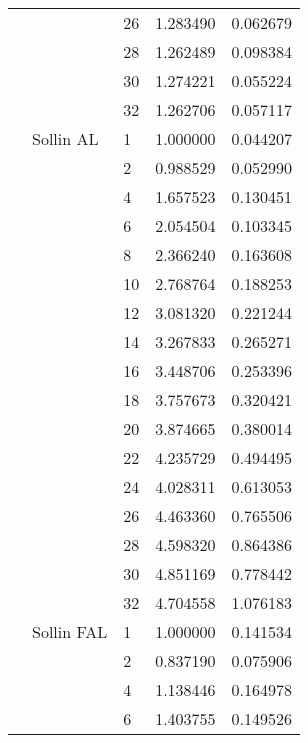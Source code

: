 \begin{tabular}{lllrr}
                      &            & 26 &  1.283490 &  0.062679 \\
                      &            & 28 &  1.262489 &  0.098384 \\
                      &            & 30 &  1.274221 &  0.055224 \\
                      &            & 32 &  1.262706 &  0.057117 \\
                      & Sollin AL & 1  &  1.000000 &  0.044207 \\
                      &            & 2  &  0.988529 &  0.052990 \\
                      &            & 4  &  1.657523 &  0.130451 \\
                      &            & 6  &  2.054504 &  0.103345 \\
                      &            & 8  &  2.366240 &  0.163608 \\
                      &            & 10 &  2.768764 &  0.188253 \\
                      &            & 12 &  3.081320 &  0.221244 \\
                      &            & 14 &  3.267833 &  0.265271 \\
                      &            & 16 &  3.448706 &  0.253396 \\
                      &            & 18 &  3.757673 &  0.320421 \\
                      &            & 20 &  3.874665 &  0.380014 \\
                      &            & 22 &  4.235729 &  0.494495 \\
                      &            & 24 &  4.028311 &  0.613053 \\
                      &            & 26 &  4.463360 &  0.765506 \\
                      &            & 28 &  4.598320 &  0.864386 \\
                      &            & 30 &  4.851169 &  0.778442 \\
                      &            & 32 &  4.704558 &  1.076183 \\
                      & Sollin FAL & 1  &  1.000000 &  0.141534 \\
                      &            & 2  &  0.837190 &  0.075906 \\
                      &            & 4  &  1.138446 &  0.164978 \\
                      &            & 6  &  1.403755 &  0.149526 \\

\end{tabular}
